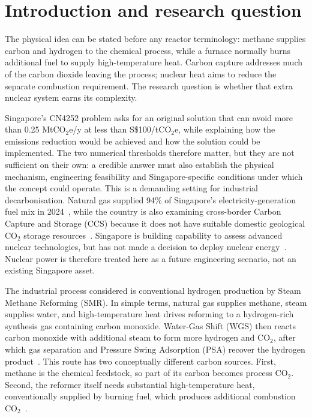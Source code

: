 \section{Introduction and research question}


The physical idea can be stated before any reactor terminology: methane supplies carbon and hydrogen to the chemical process, while a furnace normally burns additional fuel to supply high-temperature heat. Carbon capture addresses much of the carbon dioxide leaving the process; nuclear heat aims to reduce the separate combustion requirement. The research question is whether that extra nuclear system earns its complexity.

Singapore's CN4252 problem asks for an original solution that can avoid more than 0.25 MtCO$_2$e/y at less than S\$100/tCO$_2$e, while explaining how the emissions reduction would be achieved and how the solution could be implemented. The two numerical thresholds therefore matter, but they are not sufficient on their own: a credible answer must also establish the physical mechanism, engineering feasibility and Singapore-specific conditions under which the concept could operate. This is a demanding setting for industrial decarbonisation. Natural gas supplied 94\% of Singapore's electricity-generation fuel mix in 2024~\cite{ema2024context}, while the country is also examining cross-border Carbon Capture and Storage (CCS) because it does not have suitable domestic geological CO$_2$ storage resources~\cite{mti2025carbon}. Singapore is building capability to assess advanced nuclear technologies, but has not made a decision to deploy nuclear energy~\cite{mti2025nuclear,mti2026inir}. Nuclear power is therefore treated here as a future engineering scenario, not an existing Singapore asset.

The industrial process considered is conventional hydrogen production by Steam Methane Reforming (SMR). In simple terms, natural gas supplies methane, steam supplies water, and high-temperature heat drives reforming to a hydrogen-rich synthesis gas containing carbon monoxide. Water-Gas Shift (WGS) then reacts carbon monoxide with additional steam to form more hydrogen and CO$_2$, after which gas separation and Pressure Swing Adsorption (PSA) recover the hydrogen product~\cite{ieaghg2017smr}. This route has two conceptually different carbon sources. First, methane is the chemical feedstock, so part of its carbon becomes process CO$_2$. Second, the reformer itself needs substantial high-temperature heat, conventionally supplied by burning fuel, which produces additional combustion CO$_2$~\cite{ieaghg2017smr}.

